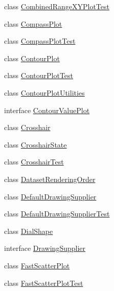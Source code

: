 \begin{DoxyCompactItemize}
\item 
class \mbox{\hyperlink{classorg_1_1jfree_1_1chart_1_1plot_1_1_combined_range_x_y_plot_test}{Combined\+Range\+X\+Y\+Plot\+Test}}
\item 
class \mbox{\hyperlink{classorg_1_1jfree_1_1chart_1_1plot_1_1_compass_plot}{Compass\+Plot}}
\item 
class \mbox{\hyperlink{classorg_1_1jfree_1_1chart_1_1plot_1_1_compass_plot_test}{Compass\+Plot\+Test}}
\item 
class \mbox{\hyperlink{classorg_1_1jfree_1_1chart_1_1plot_1_1_contour_plot}{Contour\+Plot}}
\item 
class \mbox{\hyperlink{classorg_1_1jfree_1_1chart_1_1plot_1_1_contour_plot_test}{Contour\+Plot\+Test}}
\item 
class \mbox{\hyperlink{classorg_1_1jfree_1_1chart_1_1plot_1_1_contour_plot_utilities}{Contour\+Plot\+Utilities}}
\item 
interface \mbox{\hyperlink{interfaceorg_1_1jfree_1_1chart_1_1plot_1_1_contour_value_plot}{Contour\+Value\+Plot}}
\item 
class \mbox{\hyperlink{classorg_1_1jfree_1_1chart_1_1plot_1_1_crosshair}{Crosshair}}
\item 
class \mbox{\hyperlink{classorg_1_1jfree_1_1chart_1_1plot_1_1_crosshair_state}{Crosshair\+State}}
\item 
class \mbox{\hyperlink{classorg_1_1jfree_1_1chart_1_1plot_1_1_crosshair_test}{Crosshair\+Test}}
\item 
class \mbox{\hyperlink{classorg_1_1jfree_1_1chart_1_1plot_1_1_dataset_rendering_order}{Dataset\+Rendering\+Order}}
\item 
class \mbox{\hyperlink{classorg_1_1jfree_1_1chart_1_1plot_1_1_default_drawing_supplier}{Default\+Drawing\+Supplier}}
\item 
class \mbox{\hyperlink{classorg_1_1jfree_1_1chart_1_1plot_1_1_default_drawing_supplier_test}{Default\+Drawing\+Supplier\+Test}}
\item 
class \mbox{\hyperlink{classorg_1_1jfree_1_1chart_1_1plot_1_1_dial_shape}{Dial\+Shape}}
\item 
interface \mbox{\hyperlink{interfaceorg_1_1jfree_1_1chart_1_1plot_1_1_drawing_supplier}{Drawing\+Supplier}}
\item 
class \mbox{\hyperlink{classorg_1_1jfree_1_1chart_1_1plot_1_1_fast_scatter_plot}{Fast\+Scatter\+Plot}}
\item 
class \mbox{\hyperlink{classorg_1_1jfree_1_1chart_1_1plot_1_1_fast_scatter_plot_test}{Fast\+Scatter\+Plot\+Test}}
\item 

\end{DoxyCompactItemize}
